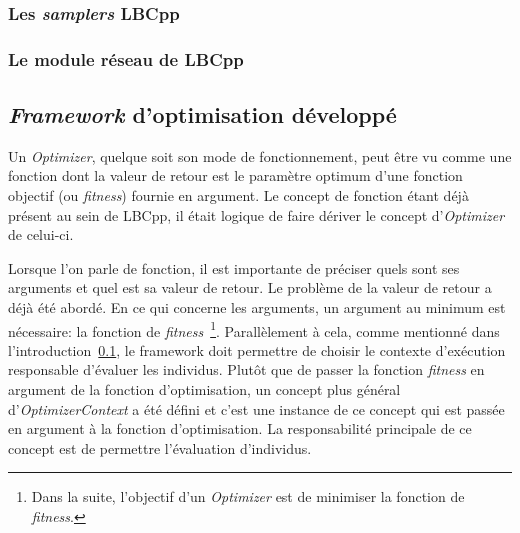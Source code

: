 \documentclass[a4paper, 11pt]{report}
\begin{document}
\subsubsection{Les \textit{samplers} LBCpp}
\subsubsection{Le module réseau de LBCpp}

\subsection{\textit{Framework} d'optimisation développé}
\label{frameworkintro}
Un \textit{Optimizer}, quelque soit son mode de fonctionnement, peut être vu comme une fonction dont la valeur de retour est le paramètre optimum d'une fonction objectif (ou \textit{fitness}) fournie en argument. Le concept de fonction étant déjà présent au sein de LBCpp, il était logique de faire dériver le concept d'\textit{Optimizer} de celui-ci.

Lorsque l'on parle de fonction, il est importante de préciser quels sont ses arguments et quel est sa valeur de retour. Le problème de la valeur de retour a déjà été abordé. En ce qui concerne les arguments, un argument au minimum est nécessaire: la fonction de \textit{fitness}~\footnote{Dans la suite, l'objectif d'un \textit{Optimizer} est de minimiser la fonction de \textit{fitness}.}. Parallèlement à cela, comme mentionné dans l'introduction~\ref{frameworkintro}, le framework doit permettre de choisir le contexte d'exécution responsable d'évaluer les individus. Plutôt que de passer la fonction \textit{fitness} en argument de la fonction d'optimisation, un concept plus général d'\textit{OptimizerContext} a été défini et c'est une instance de ce concept qui est passée en argument à la fonction d'optimisation. La responsabilité principale de ce concept est de permettre l'évaluation d'individus. %
\end{document}
